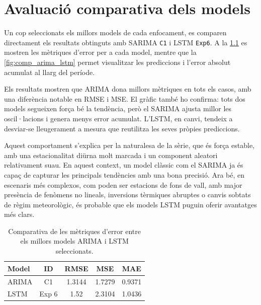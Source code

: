 \documentclass[../main.tex]{subfiles}
\begin{document}

\chapter{Avaluació comparativa dels models} \label{ch:results_comparativa_models}

Un cop seleccionats els millors models de cada enfocament, es comparen directament els resultats obtinguts amb SARIMA \texttt{C1} i LSTM \texttt{Exp6}. A la \cref{tab:comp_millor_arima_lstm} es mostren les mètriques d’error per a cada model, mentre que la \cref{fig:comp_arima_lstm}  permet visualitzar les prediccions i l’error absolut acumulat al llarg del període.

Els resultats mostren que ARIMA dona millors mètriques en tots els casos, amb una diferència notable en RMSE i MSE. El gràfic també ho confirma: tots dos models segueixen força bé la tendència, però el SARIMA ajusta millor les oscil·lacions i genera menys error acumulat. L’LSTM, en canvi, tendeix a desviar-se lleugerament a mesura que reutilitza les seves pròpies prediccions.

Aquest comportament s’explica per la naturalesa de la sèrie, que és força estable, amb una estacionalitat diürna molt marcada i un component aleatori relativament suau. En aquest context, un model clàssic com el SARIMA ja és capaç de capturar les principals tendències amb una bona precisió. Ara bé, en escenaris més complexos, com poden ser estacions de fons de vall, amb major presència de fenòmens no lineals, inversions tèrmiques abruptes o canvis sobtats de règim meteorològic, és probable que els models LSTM puguin oferir avantatges més clars. 

\begin{table}[H]
    \centering
    \small
    \renewcommand{\arraystretch}{1.2}
    \begin{tabular}{lcccc}
        \toprule
        \textbf{Model} & \textbf{ID} & \textbf{RMSE} & \textbf{MSE}& \textbf{MAE}\\
        \midrule
        ARIMA & C1& 1.3144& 1.7279& 0.9371\\
        LSTM  & Exp 6& 1.52& 2.3104& 1.0436\\
        \bottomrule
    \end{tabular}
    \caption{Comparativa de les mètriques d’error entre els millors models ARIMA i LSTM seleccionats.}
    \label{tab:comp_millor_arima_lstm}
\end{table}
\end{document}
